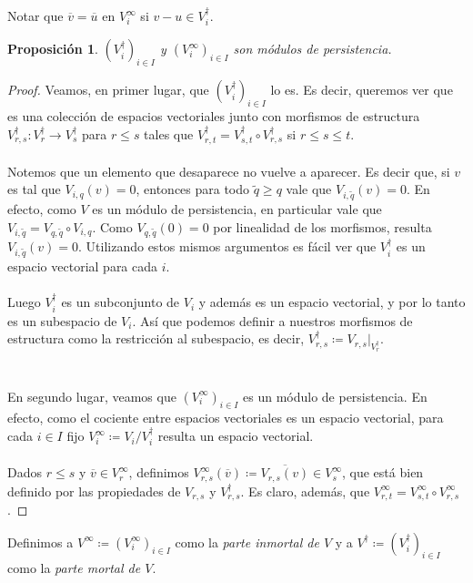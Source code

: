 \documentclass[12pt,a4paper]{article}
\newtheorem{proposition}[theorem]{Proposición}
\begin{document}
Notar que $\overline{v} = \overline{u}$ en $V^\infty_i$ si ${v-u} \in V_i^\dagger$.
\begin{proposition}
    $(V^\dagger_i)_{i \in I}$ y $(V^\infty_i)_{i \in I}$ son módulos de persistencia.
\end{proposition}
\begin{proof}
    Veamos, en primer lugar, que $(V^\dagger_i)_{i \in I}$ lo es. Es decir, queremos ver que es una colección de espacios vectoriales junto con morfismos de estructura $V_{r,s}^\dagger: V_r^\dagger \rightarrow V_s^\dagger$ para $r \leq s$ tales que $V_{r,t}^\dagger = V_{s,t}^\dagger \circ V_{r,s}^\dagger$ si $r \leq s \leq t$.
    \\
    \\
    Notemos que un elemento que desaparece no vuelve a aparecer. Es decir que, si $v$ es tal que $V_{i,q}(v) = 0$, entonces para todo $\tilde{q} \geq q$ vale que $V_{i, \tilde{q}}(v) = 0$. En efecto, como $V$ es un módulo de persistencia, en particular vale que $V_{i,\tilde{q}} = V_{q, \tilde{q}} \circ V_{i,q}$. Como $V_{q,\tilde{q}}(0) = 0$ por linealidad de los morfismos, resulta $V_{i,\tilde{q}}(v) = 0$. Utilizando estos mismos argumentos es fácil ver que $V_i^\dagger$ es un espacio vectorial para cada $i$.
    \\
    \\
    Luego $V_i^\dagger$ es un subconjunto de $V_i$ y además es un espacio vectorial, y por lo tanto es un subespacio de $V_i$. Así que podemos definir a nuestros morfismos de estructura como la restricción al subespacio, es decir, $V_{r,s}^\dagger \coloneqq V_{r,s}|_{V_r^\dagger}$.
    \\
    \\
    \\
    En segundo lugar, veamos que $(V_i^\infty)_{i \in I}$ es un módulo de persistencia. En efecto, como el cociente entre espacios vectoriales es un espacio vectorial, para cada $i \in I$ fijo $V_i^\infty \coloneqq V_i / V_i^{\dagger}$ resulta un espacio vectorial.
    \\
    \\
    Dados $r \leq s$ y $\overline{v} \in V_r^{\infty}$, definimos $V_{r,s}^{\infty}(\overline{v}) \coloneqq \overline{V_{r,s}(v)} \in V_s^{\infty}$, que está bien definido por las propiedades de $V_{r,s}$ y $V_{r,s}^{\dagger}$. Es claro, además, que $V_{r,t}^{\infty} = V_{s,t}^{\infty} \circ V_{r,s}^{\infty}$.
\end{proof}
Definimos a $V^\infty \coloneqq (V^\infty_i)_{i \in I}$ como la \textit{parte inmortal de $V$} y a $V^\dagger \coloneqq (V^\dagger_i)_{i \in I}$ como la \textit{parte mortal de $V$}.
\end{document}

